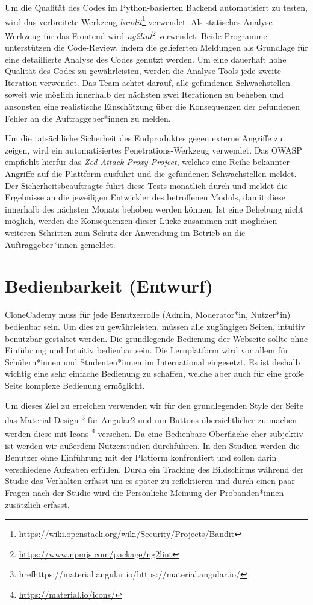 \documentclass[accentcolor=tud0b,12pt,paper=a4]{tudreport}
\begin{document}
Um die Qualität des Codes im Python-basierten Backend automatisiert zu testen, wird das verbreitete Werkzeug \emph{bandit}\footnote{\href{https://wiki.openstack.org/wiki/Security/Projects/Bandit}{https://wiki.openstack.org/wiki/Security/Projects/Bandit}} verwendet. Als statisches Analyse-Werkzeug für das Frontend wird \emph{ng2lint}\footnote{\href{https://www.npmjs.com/package/ng2lint}{https://www.npmjs.com/package/ng2lint}} verwendet. Beide Programme unterstützen die Code-Review, indem die gelieferten Meldungen als Grundlage für eine detaillierte Analyse des Codes genutzt werden. Um eine dauerhaft hohe Qualität des Codes zu gewährleisten, werden die Analyse-Tools jede zweite Iteration verwendet. Das Team achtet darauf, alle gefundenen Schwachstellen soweit wie möglich innerhalb der nächsten zwei Iterationen zu beheben und ansonsten eine realistische Einschätzung über die Konsequenzen der gefundenen Fehler an die Auftraggeber*innen zu melden.

Um die tatsächliche Sicherheit des Endproduktes gegen externe Angriffe zu zeigen, wird ein automatisiertes Penetrations-Werkzeug verwendet. Das OWASP empfiehlt hierfür das \emph{Zed Attack Proxy Project}, welches eine Reihe bekannter Angriffe auf die Plattform ausführt und die gefundenen Schwachstellen meldet. Der Sicherheitsbeauftragte führt diese Tests monatlich durch und meldet die Ergebnisse an die jeweiligen Entwickler des betroffenen Moduls, damit diese innerhalb des nächsten Monats behoben werden können. Ist eine Behebung nicht möglich, werden die Konsequenzen dieser Lücke zusammen mit möglichen weiteren Schritten zum Schutz der Anwendung im Betrieb an die Auftraggeber*innen gemeldet.

\section{Bedienbarkeit (Entwurf)}
CloneCademy muss für jede Benutzerrolle (Admin, Moderator*in, Nutzer*in) bedienbar sein. Um dies zu gewährleisten, müssen alle zugängigen Seiten, intuitiv benutzbar gestaltet werden. Die grundlegende Bedienung der Webseite sollte ohne Einführung und Intuitiv bedienbar sein. Die Lernplatform wird vor allem für Schülern*innen und Studenten*innen im International eingesetzt. Es ist deshalb wichtig eine sehr einfache Bedienung zu schaffen, welche aber auch für eine große Seite komplexe Bedienung ermöglicht.

Um dieses Ziel zu erreichen verwenden wir für den grundlegenden Style der Seite das Material Design \footnote{href{https://material.angular.io/}{https://material.angular.io/}} für Angular2 und um Buttons übersichtlicher zu machen werden diese mit Icons \footnote{\href{https://material.io/icons/}{https://material.io/icons/}} versehen. Da eine Bedienbare Oberfläche eher subjektiv ist werden wir außerdem Nutzerstudien durchführen. In den Studien werden die Benutzer ohne Einführung mit der Platform konfrontiert und sollen darin verschiedene Aufgaben erfüllen. Durch ein Tracking des Bildschirms während der Studie das Verhalten erfasst um es später zu reflektieren und durch einen paar Fragen nach der Studie wird die Persönliche Meinung der Probanden*innen zusätzlich erfasst.
\end{document}
